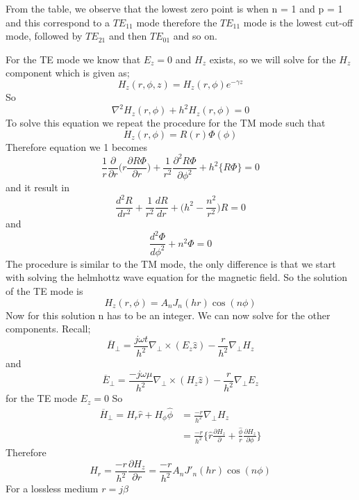 From the table, we observe that the lowest zero point is when n = 1 and p = 1 and this correspond to a $TE_{11}$ mode therefore the $TE_{11}$ mode is the lowest cut-off mode, followed by $TE_{21}$ and then $TE_{01}$ and so on.

For the TE mode we know that $E_z = 0$ and $H_z$ exists, so we will solve for the $H_z$   component which is given as;
$$H_z(r,\phi,z) = H_z(r,\phi)e^{-\gamma z}$$ So \begin{equation} \nabla^2 H_z(r,\phi) +  h^2 H_z(r,\phi) = 0\end{equation}
To solve this equation we repeat the procedure for the TM mode such that 
$$H_z(r,\phi)= R(r)\Phi(\phi)$$
Therefore equation we 1 becomes
$$ \frac{1}{r}\frac{\partial}{\partial r}\bigg(r\frac{\partial R\Phi}{\partial r}\bigg) + \frac{1}{r^2}\frac{\partial^2 R\Phi}{\partial \phi^2} + h^2\{R\Phi\} = 0$$
and it result in
\begin{equation}
\dfrac{d^2 R}{dr^2} + \frac{1}{r^2}\dfrac{dR}{dr} + \bigg(h^2 - \frac{n^2}{r^2}\bigg)R = 0
\end{equation}
and 
\begin{equation}
\dfrac{d^2\Phi}{d\phi^2} + n^2\Phi = 0
\end{equation}
The procedure is similar to the TM mode, the only difference is that we start with solving  the helmhottz wave equation for the magnetic field.
So the solution of the TE mode is 
$$ H_z(r,\phi) = A_nJ_n(hr)\cos(n\phi)$$
Now for this solution n has to be an integer. We can now solve for the other components. Recall;
$$ \overline{H}_\perp = \frac{j\omega t}{h^2}\nabla_\perp\times(E_z\hat{z}) - \frac{r}{h^2}\nabla_\perp H_z$$ and
$$\overline{E}_\perp = \frac{-j\omega \mu}{h^2}\nabla_\perp\times(H_z\hat{z}) - \frac{r}{h^2}\nabla_\perp E_z$$
for the TE mode $E_z = 0$ So 
\begin{align} 
\overline{H}_\perp = H_r \hat{r} + H_\phi \hat{\phi} &= \frac{-r}{h^2}\nabla_\perp H_z\\
&= \frac{-r}{h^2}\bigg\{ 
\hat{r}\frac{\partial H_z}{\partial} + \frac{\hat{\phi}}{r} \frac{\partial H_z}{\partial \phi}   
\bigg\}
\end{align}
Therefore
$$H_r = \frac{-r}{h^2}\frac{\partial H_z}{\partial r} =  \frac{-r}{h^2}A_nJ'_n(hr)\cos(n\phi)$$
For a lossless medium $ r =j\beta$

